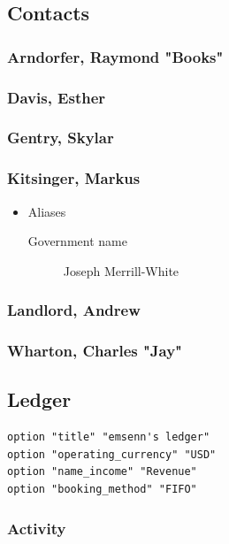 \documentclass[11pt]{article}
\begin{document}
\subsection*{Contacts}
\label{sec:org7aa313e}
\startcontents[level-2]
\subsubsection*{Arndorfer, Raymond "Books"}
\label{sec:orgfc1785f}
\subsubsection*{Davis, Esther}
\label{sec:orgbc523a8}
\subsubsection*{Gentry, Skylar}
\label{sec:orgd35d8bd}
\subsubsection*{Kitsinger, Markus}
\label{sec:org1e92b0a}
\begin{itemize}
\item Aliases
\begin{description}
\item[{Government name}] Joseph Merrill-White
\end{description}
\end{itemize}
\subsubsection*{Landlord, Andrew}
\label{sec:orgd691bdc}
\subsubsection*{Wharton, Charles "Jay"}
\label{sec:orgec55ffa}
\stopcontents[level-2]
\subsection*{Ledger}
\label{sec:org9eb6ba8}
\begin{verbatim}
option "title" "emsenn's ledger"
option "operating_currency" "USD"
option "name_income" "Revenue"
option "booking_method" "FIFO"
\end{verbatim}
\subsubsection*{Activity}
\label{sec:org5fe0db1}
\end{document}
